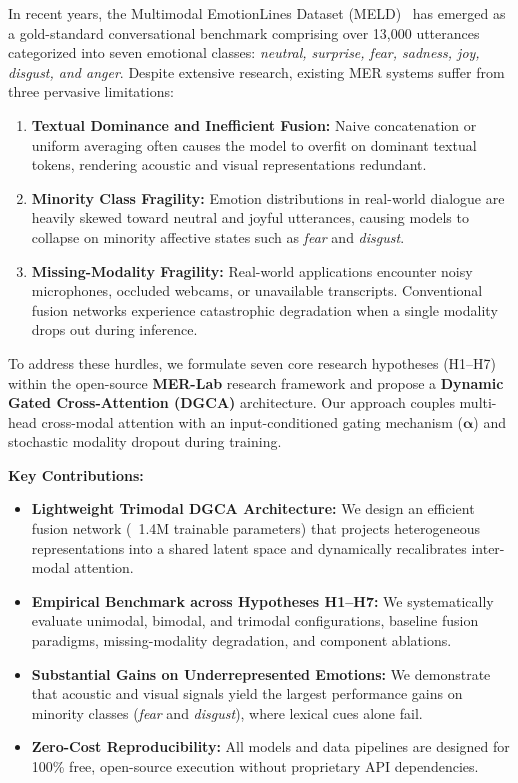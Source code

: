 \documentclass[10pt,twocolumn,letterpaper]{article}
\begin{document}
In recent years, the Multimodal EmotionLines Dataset (MELD)~\cite{poria2019meld} has emerged as a gold-standard conversational benchmark comprising over 13,000 utterances categorized into seven emotional classes: \textit{neutral, surprise, fear, sadness, joy, disgust, and anger}. Despite extensive research, existing MER systems suffer from three pervasive limitations:
\begin{enumerate}
    \item \textbf{Textual Dominance and Inefficient Fusion:} Naive concatenation or uniform averaging often causes the model to overfit on dominant textual tokens, rendering acoustic and visual representations redundant.
    \item \textbf{Minority Class Fragility:} Emotion distributions in real-world dialogue are heavily skewed toward neutral and joyful utterances, causing models to collapse on minority affective states such as \textit{fear} and \textit{disgust}.
    \item \textbf{Missing-Modality Fragility:} Real-world applications encounter noisy microphones, occluded webcams, or unavailable transcripts. Conventional fusion networks experience catastrophic degradation when a single modality drops out during inference.
\end{enumerate}

To address these hurdles, we formulate seven core research hypotheses (H1--H7) within the open-source \textbf{MER-Lab} research framework and propose a \textbf{Dynamic Gated Cross-Attention (DGCA)} architecture. Our approach couples multi-head cross-modal attention with an input-conditioned gating mechanism ($\mathbf{\alpha}$) and stochastic modality dropout during training.

\noindent\textbf{Key Contributions:}
\begin{itemize}
    \item \textbf{Lightweight Trimodal DGCA Architecture:} We design an efficient fusion network (~1.4M trainable parameters) that projects heterogeneous representations into a shared latent space and dynamically recalibrates inter-modal attention.
    \item \textbf{Empirical Benchmark across Hypotheses H1--H7:} We systematically evaluate unimodal, bimodal, and trimodal configurations, baseline fusion paradigms, missing-modality degradation, and component ablations.
    \item \textbf{Substantial Gains on Underrepresented Emotions:} We demonstrate that acoustic and visual signals yield the largest performance gains on minority classes (\textit{fear} and \textit{disgust}), where lexical cues alone fail.
    \item \textbf{Zero-Cost Reproducibility:} All models and data pipelines are designed for 100\% free, open-source execution without proprietary API dependencies.
\end{itemize}
\end{document}
